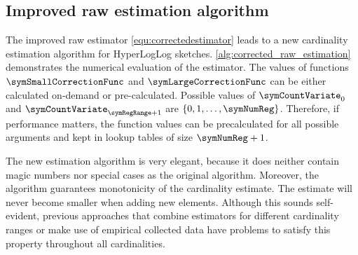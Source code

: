 \documentclass[a4paper]{scrartcl}
\begin{document}
\subsection{Improved raw estimation algorithm}
The improved raw estimator \eqref{equ:correctedestimator} leads to a new cardinality estimation algorithm for HyperLogLog sketches. \cref{alg:corrected_raw_estimation} demonstrates the numerical evaluation of the estimator. The values of functions $\symSmallCorrectionFunc$ and $\symLargeCorrectionFunc$ can be either calculated on-demand or pre-calculated. Possible values of $\symCountVariate_0$ and $\symCountVariate_{\symRegRange+1}$ are $\{0,1,\ldots, \symNumReg\}$. Therefore, if performance matters, the function values can be precalculated for all possible arguments and kept in lookup tables of size $\symNumReg+1$.

The new estimation algorithm is very elegant, because it does neither contain magic numbers nor special cases as the original algorithm. Moreover, the algorithm guarantees monotonicity of the cardinality estimate. The estimate will never become smaller when adding new elements. Although this sounds self-evident, previous approaches that combine estimators for different cardinality ranges or make use of empirical collected data have problems to satisfy this property throughout all cardinalities.
\end{document}
